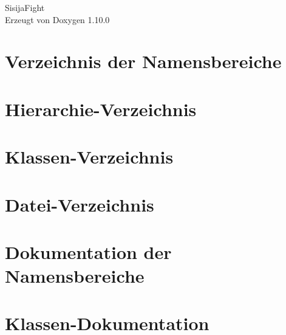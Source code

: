 \documentclass[twoside]{book}
\newcommand{\+}{\discretionary{\mbox{\scriptsize$\hookleftarrow$}}{}{}}
\newcommand{\clearemptydoublepage}{%
    \newpage{\pagestyle{empty}\cleardoublepage}%
  }
\begin{document}
  \raggedbottom
    \hypersetup{pageanchor=false,
                bookmarksnumbered=true,
                pdfencoding=unicode
               }
  \begin{titlepage}
  \vspace*{7cm}
  \begin{center}%
  {\Large Sisija\+Fight}\\
  \vspace*{1cm}
  {\large Erzeugt von Doxygen 1.10.0}\\
  \end{center}
  \end{titlepage}
  \clearemptydoublepage
  \tableofcontents
  \clearemptydoublepage
  \hypersetup{pageanchor=true}
\chapter{Verzeichnis der Namensbereiche}

\chapter{Hierarchie-\/\+Verzeichnis}

\chapter{Klassen-\/\+Verzeichnis}

\chapter{Datei-\/\+Verzeichnis}

\chapter{Dokumentation der Namensbereiche}

\chapter{Klassen-\/\+Dokumentation}





























\end{document}
